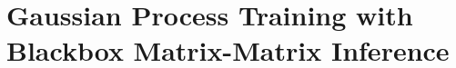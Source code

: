\chapter{Gaussian Process Training with Blackbox Matrix-Matrix Inference}
\label{chapter:bbmm}








%

%

%

%
